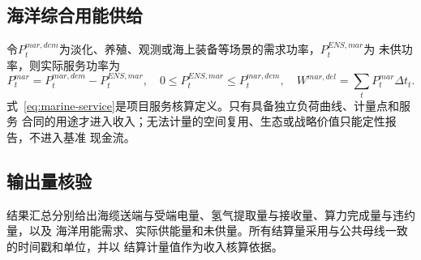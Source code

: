 \subsection{海洋综合用能供给}

令$P_t^{mar,dem}$为淡化、养殖、观测或海上装备等场景的需求功率，$P_t^{ENS,mar}$为
未供功率，则实际服务功率为
\begin{equation}
P_t^{mar}=P_t^{mar,dem}-P_t^{ENS,mar},
\quad
0\le P_t^{ENS,mar}\le P_t^{mar,dem},
\quad
W^{mar,del}=\sum_t P_t^{mar}\Delta t_t.
\label{eq:marine-service}
\end{equation}
式~\eqref{eq:marine-service}是项目服务核算定义。只有具备独立负荷曲线、计量点和服务
合同的用途才进入收入；无法计量的空间复用、生态或战略价值只能定性报告，不进入基准
现金流。

\subsection{输出量核验}

结果汇总分别给出海缆送端与受端电量、氢气提取量与接收量、算力完成量与违约量，以及
海洋用能需求、实际供能量和未供量。所有结算量采用与公共母线一致的时间戳和单位，并以
结算计量值作为收入核算依据。
